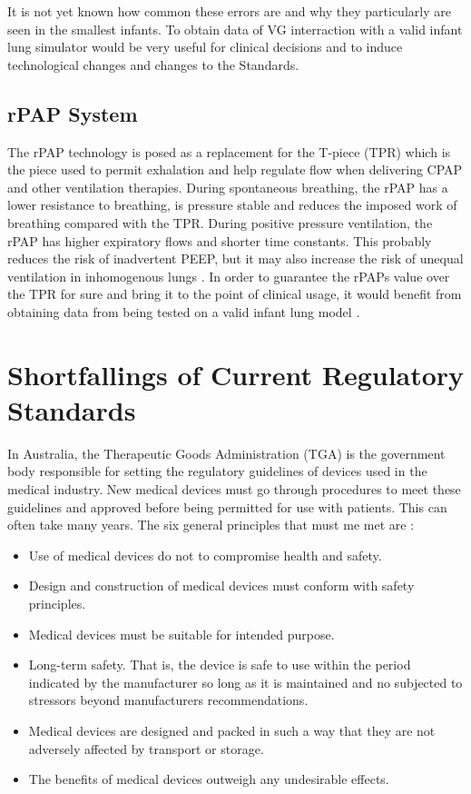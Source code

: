 \documentclass[12pt, openany, oneside]{book}
\begin{document}
It is not yet known how common these errors are and why they particularly are seen in the smallest infants. To obtain data of VG interraction with a valid infant lung simulator would be very useful for clinical decisions and to induce technological changes and changes to the Standards.



\subsection{rPAP System}
The rPAP technology is posed as a replacement for the T-piece (TPR) which is the piece used to permit exhalation and help regulate flow when delivering CPAP and other ventilation therapies. During spontaneous breathing, the rPAP has a lower resistance to breathing, is pressure stable and reduces the imposed work of breathing compared with the TPR. During positive pressure ventilation, the rPAP has higher expiratory flows and shorter time constants. This probably reduces the risk of inadvertent PEEP, but it may also increase the risk of unequal ventilation in inhomogenous lungs \citep{thomas}. In order to guarantee the rPAPs value over the TPR for sure and bring it to the point of clinical usage, it would benefit from obtaining data from being tested on a valid infant lung model .



\section{Shortfallings of Current Regulatory Standards}

In Australia, the Therapeutic Goods Administration (TGA) is the government body responsible for setting the regulatory guidelines of devices used in the medical industry. New medical devices must go through procedures to meet these guidelines and approved before being permitted for use with patients. This can often take many years. The six general principles that must me met are \cite{tga}:

\begin{itemize}
\item Use of medical devices do not to compromise health and safety.
\item Design and construction of medical devices must conform with safety principles.
\item Medical devices must be suitable for intended purpose.
\item Long-term safety. That is, the device is safe to use within the period indicated by the manufacturer so long as it is maintained and no subjected to stressors beyond manufacturers recommendations. 
\item Medical devices are designed and packed in such a way that they are not adversely affected by transport or storage.
\item The benefits of medical devices outweigh any undesirable effects. 

\end{itemize}
\end{document}
